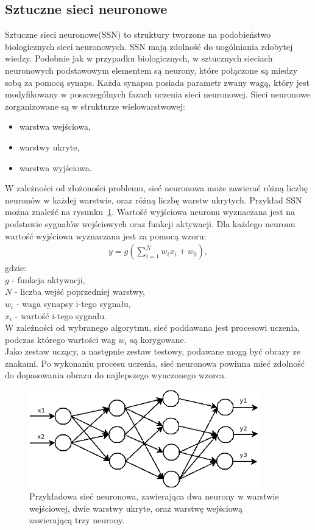 \subsection{Sztuczne sieci neuronowe}
Sztuczne sieci neuronowe(SSN) to struktury tworzone na podobieństwo biologicznych sieci neuronowych. SSN mają zdolność do uogólniania zdobytej wiedzy. Podobnie jak w przypadku biologicznych, w sztucznych sieciach neuronowych podstawowym elementem są neurony, które połączone są miedzy sobą za pomocą synaps. Każda synapsa posiada parametr zwany wagą, który jest modyfikowany w poszczególnych fazach uczenia sieci neuronowej. Sieci neuronowe zorganizowane są w strukturze wielowarstwowej:
\begin{itemize}
  \item warstwa wejściowa,
  \item warstwy ukryte,
  \item warstwa wyjściowa.
\end{itemize}
W zależności od złożoności problemu, sieć neuronowa może zawierać różną liczbę neuronów w każdej warstwie, oraz różną liczbę warstw ukrytych. Przykład SSN można znaleźć na rysunku~\ref{fig:ssn_example}. Wartość wyjściowa neuronu wyznaczana jest na podstawie sygnałów wejściowych oraz funkcji aktywacji. Dla każdego neuronu wartość wyjściowa wyznaczana jest za pomocą wzoru:
\begin{gather*}
  y = g(\sum_{i=1}^{N}w_ix_i+w_0),
\end{gather*}
gdzie:\\
$g$ - funkcja aktywacji,\\
$N$ - liczba wejść poprzedniej warstwy,\\
$w_i$ - waga synapsy i-tego sygnału,\\
$x_i$ - wartość i-tego sygnału.\\
W zależności od wybranego algorytmu, sieć poddawana jest procesowi uczenia, podczas którego wartości wag $w_i$ są korygowane.\\
Jako zestaw uczący, a następnie zestaw testowy, podawane mogą być obrazy ze znakami. Po wykonaniu procesu uczenia, sieć neuronowa powinna mieć zdolność do dopasowania obrazu do najlepszego wyuczonego wzorca. 
\begin{figure}
  \centering
  \includegraphics[width=10cm]{img/ssn-example}
  \caption{Przykładowa sieć neuronowa, zawierająca dwa neurony w warstwie wejściowej, dwie warstwy ukryte, oraz warstwę wejściową zawierającą trzy neurony.}
  \label{fig:ssn_example}
\end{figure}
